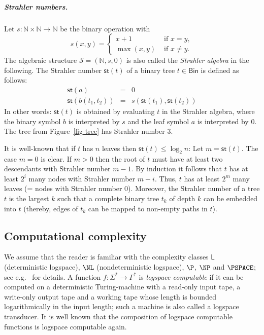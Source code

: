 \documentclass[a4paper,UKenglish,cleveref, autoref, thm-restate, numberwithinsect]{lipics-v2021}
\newcommand{\Bin}{\mathsf{Bin}}
\newcommand{\hs}{\mathsf{st}}
\newcommand{\LS}{\mathsf{L}}
\begin{document}
\subparagraph{Strahler numbers.} \label{page-st}
Let $s \colon \mathbb{N} \times \mathbb{N} \to \mathbb{N}$ be the binary operation with
\begin{equation} \label{eq-strahler-algebra}
s(x,y) = \begin{cases} 
x+1 & \text{ if } x = y, \\
\max(x,y) & \text{ if } x \neq y.
\end{cases}
\end{equation}
The algebraic structure $\mathcal{S} = (\mathbb{N}, s,0)$ is also called the \emph{Strahler algebra} in the following.
The Strahler number $\hs(t)$ of a binary tree $t \in \Bin$ is defined as follows:
\begin{eqnarray*}
\hs(a) & = & 0 \\
\hs(b(t_1, t_2)) & = & s(\hs(t_1), \hs(t_2)) 
\end{eqnarray*}
In other words:
$\hs(t)$ is obtained by evaluating $t$ in the Strahler algebra, where the binary symbol $b$ is interpreted by $s$ and the leaf symbol 
$a$ is interpreted by $0$. The tree from Figure~\ref{fig tree} has Strahler number 3.

It is well-known that if $t$ has $n$ leaves then $\hs(t) \leq \log_2 n$: Let $m = \hs(t)$. The case $m = 0$ is clear. 
If $m > 0$ then the root of $t$ must have at least two descendants 
with Strahler number $m-1$. By induction it follows that $t$ has at least $2^i$ many nodes with Strahler number $m-i$. Thus, $t$ has at least
$2^m$ many leaves (= nodes with Strahler number $0$). Moreover, 
the Strahler number of a tree $t$ is the largest $k$ such that a complete binary tree $t_k$ of depth $k$ can be embedded into $t$ (thereby,
edges of $t_k$ can be mapped to non-empty paths in $t$).



\subsection{Computational complexity} \label{sec-CC}

We assume that the reader is familiar with the complexity classes $\LS$ (deterministic logspace),
$\NL$ (nondeterministic logspace),
$\P$, $\NP$ and $\PSPACE$; see e.g.~\cite{AroBar09} for details.
A function $f \colon \Sigma^* \to \Gamma^*$ is  \emph{logspace computable} if it can be computed on a deterministic Turing-machine with
a read-only input tape, a write-only output tape and a working tape whose length is bounded logarithmically in the input length; such a machine is also called a logspace transducer. It is well known that the composition of logspace computable functions is logspace computable again.
\end{document}
